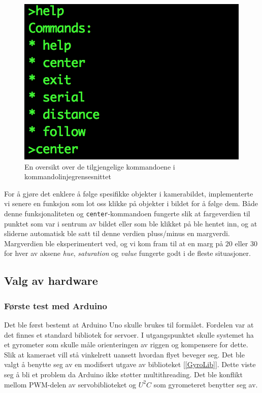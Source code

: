 \begin{figure}[h!]
	\centering
	\includegraphics[scale=0.8]{img/command-menu.png}
	\caption{En oversikt over de tilgjengelige kommandoene i kommandolinjegrensesnittet}
	\label{fig:commandmenu}
\end{figure}

For å gjøre det enklere å følge spesifikke objekter i kamerabildet, implementerte vi senere en funksjon som lot oss klikke på objekter i bildet for å følge dem. Både denne funksjonaliteten og \texttt{center}-kommandoen fungerte slik at fargeverdien til punktet som var i sentrum av bildet eller som ble klikket på ble hentet inn, og at sliderne automatisk ble satt til denne verdien pluss/minus en margverdi. Margverdien ble eksperimentert ved, og vi kom fram til at en marg på $20$ eller $30$ for hver av aksene \emph{hue}, \emph{saturation} og \emph{value} fungerte godt i de fleste situasjoner.

\subsection{Valg av hardware}
\subsubsection{Første test med Arduino}
Det ble først bestemt at Arduino Uno skulle brukes til formålet. Fordelen var at det finnes et standard bibliotek for servoer. I utgangspunktet skulle systemet ha et gyrometer som skulle måle orienteringen av riggen og kompensere for dette. Slik at kameraet vill stå vinkelrett uansett hvordan flyet beveger seg. Det ble valgt å benytte seg av en modifsert utgave av biblioteket [\ref{GyroLib}]. Dette viste seg å bli et problem da Arduino ikke støtter multithreading. Det ble konflikt mellom PWM-delen av servobiblioteket og $U^2C$ som gyrometeret benytter seg av.

